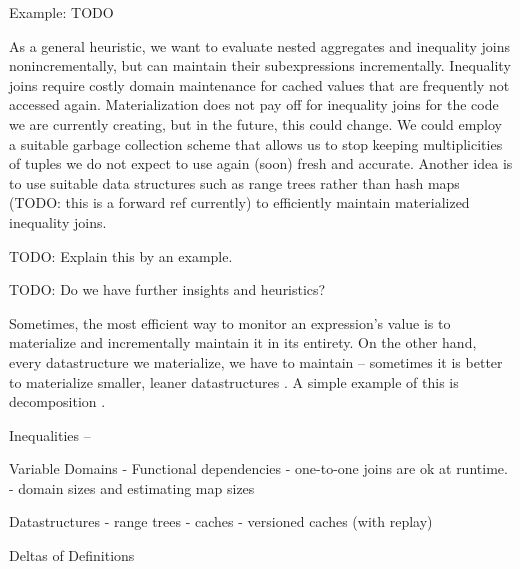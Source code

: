 Example: TODO


As a general heuristic, we want to evaluate nested aggregates and inequality joins nonincrementally, but can maintain their subexpressions incrementally. Inequality joins
require costly domain maintenance for cached values that are frequently not accessed again.
Materialization does not pay off for inequality joins for the code we are currently creating,
but in the future, this could change. We could employ a suitable garbage collection scheme that allows us to stop keeping multiplicities of tuples we do not expect to use again (soon) fresh and accurate. Another idea is to use
suitable data structures such as range trees rather than hash maps (TODO: this is a forward ref currently) to efficiently maintain materialized inequality joins.

TODO: Explain this by an example.

TODO: Do we have further insights and heuristics?









Sometimes, the most efficient way to monitor an expression's value is to materialize and incrementally maintain it in its entirety.  On the other hand, every datastructure we materialize, we have to maintain -- sometimes it is better to materialize smaller, leaner datastructures .  A simple example of this is decomposition .




Inequalities -- 

Variable Domains
  - Functional dependencies
    - one-to-one joins are ok at runtime.
  - domain sizes and estimating map sizes

Datastructures
  - range trees
  - caches
  - versioned caches (with replay)

Deltas of Definitions
